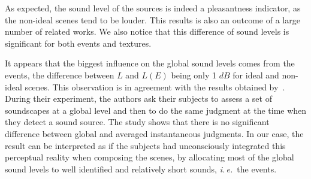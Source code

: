 \documentclass[12pt]{elsarticle}
\newcommand{\ie}{\emph{i.\,e.}}
\newcommand{\al}{\emph{et~al.}}
\begin{document}
As expected, the sound level of the sources is indeed a pleasantness indicator, as the non-ideal scenes tend to be louder. This results is also an outcome of a large number of related works. We also notice that this difference of sound levels is significant for both events and textures.



It appears that the biggest influence on the global sound levels comes from the events, the difference between $L$ and $L(E)$ being only 1 $dB$ for ideal and non-ideal scenes. This observation is in agreement with the results obtained by~\cite{kuwano_memory_2003}. During their experiment, the authors ask their subjects to assess a set of soundscapes at a global level and then to do the same judgment at the time when they detect a sound source. The study shows that there is no significant difference between global and averaged instantaneous judgments. In our case, the result can be interpreted as if the subjects had unconsciously integrated this perceptual reality when composing the scenes, by allocating most of the global sound levels to well identified and relatively short sounds, \ie~the events.

\end{document}
